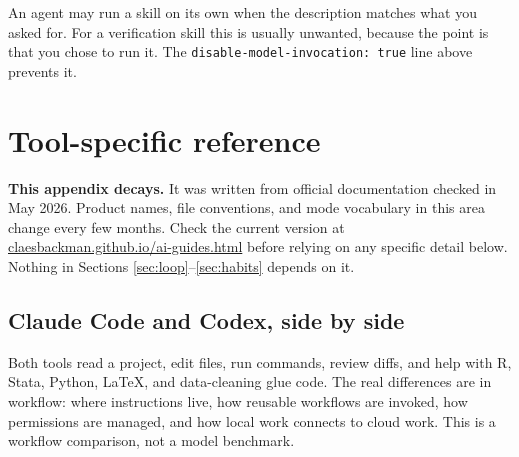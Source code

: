 \documentclass[11pt,a4paper]{article}
\newcommand{\code}[1]{\texttt{\small #1}}
\begin{document}
An agent may run a skill on its own when the description matches what you asked
for. For a verification skill this is usually unwanted, because the point is
that you chose to run it. The \mbox{\code{disable-model-invocation: true}} line
above prevents it.

\clearpage
\section{Tool-specific reference}
\label{app:tools}

\begin{aside}
\textbf{This appendix decays.} It was written from official documentation checked
in May 2026. Product names, file conventions, and mode vocabulary in this area
change every few months. Check the current version at
\href{https://claesbackman.github.io/ai-guides.html}{claesbackman.github.io/ai-guides.html}
before relying on any specific detail below. Nothing in
Sections \ref{sec:loop}--\ref{sec:habits} depends on it.
\end{aside}

\subsection{Claude Code and Codex, side by side}

Both tools read a project, edit files, run commands, review diffs, and help with
R, Stata, Python, LaTeX, and data-cleaning glue code. The real differences are in
workflow: where instructions live, how reusable workflows are invoked, how
permissions are managed, and how local work connects to cloud work. This is a
workflow comparison, not a model benchmark.
\end{document}

